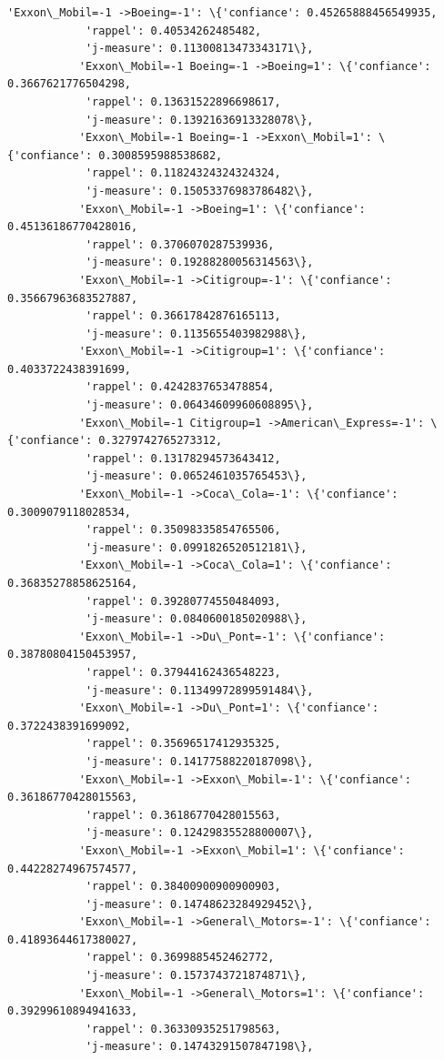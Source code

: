 \documentclass[11pt]{article}
\begin{document}
\begin{Verbatim}[commandchars=\\\{\}]
           'Exxon\_Mobil=-1 ->Boeing=-1': \{'confiance': 0.45265888456549935,
            'rappel': 0.40534262485482,
            'j-measure': 0.11300813473343171\},
           'Exxon\_Mobil=-1 Boeing=-1 ->Boeing=1': \{'confiance': 0.3667621776504298,
            'rappel': 0.13631522896698617,
            'j-measure': 0.13921636913328078\},
           'Exxon\_Mobil=-1 Boeing=-1 ->Exxon\_Mobil=1': \{'confiance': 0.3008595988538682,
            'rappel': 0.11824324324324324,
            'j-measure': 0.15053376983786482\},
           'Exxon\_Mobil=-1 ->Boeing=1': \{'confiance': 0.45136186770428016,
            'rappel': 0.3706070287539936,
            'j-measure': 0.19288280056314563\},
           'Exxon\_Mobil=-1 ->Citigroup=-1': \{'confiance': 0.35667963683527887,
            'rappel': 0.36617842876165113,
            'j-measure': 0.1135655403982988\},
           'Exxon\_Mobil=-1 ->Citigroup=1': \{'confiance': 0.4033722438391699,
            'rappel': 0.4242837653478854,
            'j-measure': 0.06434609960608895\},
           'Exxon\_Mobil=-1 Citigroup=1 ->American\_Express=-1': \{'confiance': 0.3279742765273312,
            'rappel': 0.13178294573643412,
            'j-measure': 0.0652461035765453\},
           'Exxon\_Mobil=-1 ->Coca\_Cola=-1': \{'confiance': 0.3009079118028534,
            'rappel': 0.35098335854765506,
            'j-measure': 0.0991826520512181\},
           'Exxon\_Mobil=-1 ->Coca\_Cola=1': \{'confiance': 0.36835278858625164,
            'rappel': 0.39280774550484093,
            'j-measure': 0.0840600185020988\},
           'Exxon\_Mobil=-1 ->Du\_Pont=-1': \{'confiance': 0.38780804150453957,
            'rappel': 0.37944162436548223,
            'j-measure': 0.11349972899591484\},
           'Exxon\_Mobil=-1 ->Du\_Pont=1': \{'confiance': 0.3722438391699092,
            'rappel': 0.35696517412935325,
            'j-measure': 0.14177588220187098\},
           'Exxon\_Mobil=-1 ->Exxon\_Mobil=-1': \{'confiance': 0.36186770428015563,
            'rappel': 0.36186770428015563,
            'j-measure': 0.12429835528800007\},
           'Exxon\_Mobil=-1 ->Exxon\_Mobil=1': \{'confiance': 0.44228274967574577,
            'rappel': 0.38400900900900903,
            'j-measure': 0.14748623284929452\},
           'Exxon\_Mobil=-1 ->General\_Motors=-1': \{'confiance': 0.41893644617380027,
            'rappel': 0.3699885452462772,
            'j-measure': 0.1573743721874871\},
           'Exxon\_Mobil=-1 ->General\_Motors=1': \{'confiance': 0.39299610894941633,
            'rappel': 0.36330935251798563,
            'j-measure': 0.14743291507847198\},

\end{Verbatim}
\end{document}
